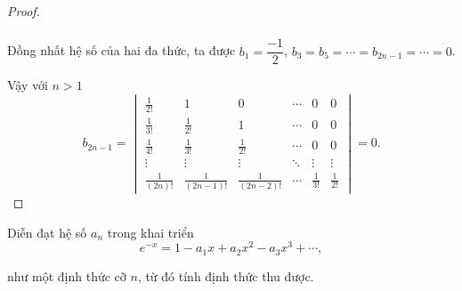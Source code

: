 \documentclass[class=linearalgebra,crop=false]{standalone}
\begin{document}
\begin{proof}
\begin{align*}
    \end{align*}
    \par Đồng nhất hệ số của hai đa thức, ta được $b_{1} = \dfrac{-1}{2}$, $b_{3} = b_{5} = \cdots = b_{2n-1} = \cdots = 0$.
    \par Vậy với $n > 1$
    \[
        b_{2n-1} =
        \begin{vmatrix}
            \frac{1}{2!}    & 1                 & 0                 & \cdots & 0            & 0            \\
            \frac{1}{3!}    & \frac{1}{2!}      & 1                 & \cdots & 0            & 0            \\
            \frac{1}{4!}    & \frac{1}{3!}      & \frac{1}{2!}      & \cdots & 0            & 0            \\
            \vdots          & \vdots            & \vdots            & \ddots & \vdots       & \vdots       \\
            \frac{1}{(2n)!} & \frac{1}{(2n-1)!} & \frac{1}{(2n-2)!} & \cdots & \frac{1}{3!} & \frac{1}{2!}
        \end{vmatrix}
        = 0.
    \]
\end{proof}

\begin{exercise}
    \par Diễn đạt hệ số $a_{n}$ trong khai triển
    \[
        e^{-x} = 1 - a_{1}x + a_{2}x^{2} - a_{3}x^{3} + \cdots ,
    \]
    \par như một định thức cỡ $n$, từ đó tính định thức thu được.
\end{exercise}
\end{document}
